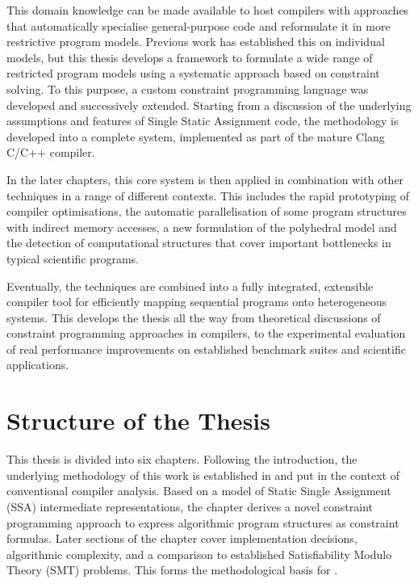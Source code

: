     This domain knowledge can be made available to host compilers with
    approaches that automatically specialise general-purpose code and
    reformulate it in more restrictive program models.
    Previous work has established this on individual models, but this thesis
    develops a framework to formulate a wide range of restricted program models
    using a systematic approach based on constraint solving.
    To this purpose, a custom constraint programming language was developed
    and successively extended.
    Starting from a discussion of the underlying assumptions and features of
    Single Static Assignment code, the methodology is developed into a complete
    system, implemented as part of the mature Clang C/C++ compiler.

    In the later chapters, this core system is then applied in combination
    with other techniques in a range of different contexts.
    This includes the rapid prototyping of compiler optimisations, the
    automatic parallelisation of some program structures with indirect memory
    accesses, a new formulation of the polyhedral model and the detection of
    computational structures that cover important bottlenecks in typical
    scientific programs.

    Eventually, the techniques are combined into a fully integrated, extensible
    compiler tool for efficiently mapping sequential programs onto heterogeneous
    systems.
    This develops the thesis all the way from theoretical discussions of
    constraint programming approaches in compilers, to the experimental
    evaluation of real performance improvements on established benchmark suites
    and scientific applications.

\newpage
\section{Structure of the Thesis}

    This thesis is divided into six chapters.
    Following the introduction, the underlying methodology of this work is
    established in {\bf{}} and put in the context of
    conventional compiler analysis.
    Based on a model of Static Single Assignment (SSA) intermediate
    representations, the chapter derives a novel constraint programming approach
    to express algorithmic program structures as constraint formulas.
    Later sections of the chapter cover implementation decisions, algorithmic
    complexity, and a comparison to established Satisfiability Modulo Theory
    (SMT) problems.
    This forms the methodological basis for
    {\bf{}}.

